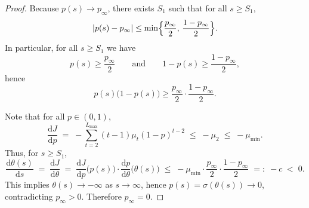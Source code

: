 \begin{proof}
Because $p(s)\to p_\infty$, there exists $S_1$ such that for all $s \geq S_1$,
\begin{equation}
    |p(s)-p_\infty| \le \min\Bigl\{\frac{p_\infty}{2},\,\frac{1-p_\infty}{2}\Bigr\}.
\end{equation}
In particular, for all $s\ge S_1$ we have
\begin{equation}
    p(s)\ge \frac{p_\infty}{2}
    \qquad\text{and}\qquad
    1-p(s)\ge \frac{1-p_\infty}{2},
\end{equation}
hence
\begin{equation}
    p(s)\bigl(1-p(s)\bigr)\ge \frac{p_\infty}{2}\cdot \frac{1-p_\infty}{2}.
\end{equation}

Note that for all $p\in(0,1)$,
\begin{equation}
    \frac{\mathrm{d}J}{\mathrm{d}p}
    \;=\; -\sum_{t=2}^{L_{\max}} (t-1)\mu_t (1-p)^{t-2}
    \;\leq\; -\mu_2
    \;\leq\; -\mu_{\min}.
\end{equation}
Thus, for $s \geq S_1$,
\begin{equation}
    \frac{\mathrm{d}\theta(s)}{\mathrm{d}s}
    \;=\; \frac{\mathrm{d}J}{\mathrm{d}\theta}
    \;=\; \frac{\mathrm{d}J}{\mathrm{d}p}\bigl(p(s)\bigr)\cdot \frac{\mathrm{d}p}{\mathrm{d}\theta}\bigl(\theta(s)\bigr)
    \;\leq\; -\mu_{\min}\cdot \frac{p_\infty}{2}\cdot \frac{1-p_\infty}{2}
    \;=:\; -c \;<\; 0.
\end{equation}
This implies $\theta(s) \to -\infty$ as $s\to\infty$, hence $p(s)=\sigma(\theta(s))\to 0$, contradicting $p_\infty>0$. Therefore $p_\infty=0$.


\end{proof}
